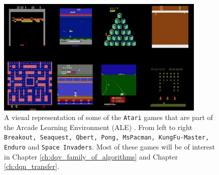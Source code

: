 \begin{figure}[ht!]
\centering
  \includegraphics[width=10cm]{./Images/Chapter02/atari_games}
  \caption{A visual representation of some of the \texttt{Atari} games that are part of the Arcade Learning Environment (ALE) \cite{bellemare2013arcade}. From left to right \texttt{Breakout, Seaquest, Qbert, Pong, MsPacman, KungFu-Master, Enduro} and \texttt{Space Invaders}. Most of these games will be of interest in Chapter \ref{ch:dqv_family_of_algorithms} and Chapter \ref{ch:dqn_transfer}.}
  \label{fig:atari_games}
\end{figure}


